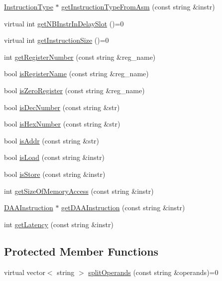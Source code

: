 \begin{DoxyCompactItemize}
\item 
\hyperlink{classInstructionType}{Instruction\+Type} $\ast$ \hyperlink{classArch__dep_ab08ac366e83b7b1f32b982849c9c3ee5}{get\+Instruction\+Type\+From\+Asm} (const string \&instr)
\item 
virtual int \hyperlink{classArch__dep_a7f9d441d7b402294c6faf7b81ee5aa59}{get\+N\+B\+Instr\+In\+Delay\+Slot} ()=0
\item 
virtual int \hyperlink{classArch__dep_a845395b8503a23b2c192e8b4a05ccba9}{get\+Instruction\+Size} ()=0
\item 
int \hyperlink{classArch__dep_adb2c2145f6abeb415436bbe3d622cf70}{get\+Register\+Number} (const string \&reg\+\_\+name)
\item 
bool \hyperlink{classArch__dep_ac12a732622a72990042fc34c96ad0188}{is\+Register\+Name} (const string \&reg\+\_\+name)
\item 
bool \hyperlink{classArch__dep_aaf6d066028c438c8e01194eb13500468}{is\+Zero\+Register} (const string \&reg\+\_\+name)
\item 
bool \hyperlink{classArch__dep_a674e544699e6ba167f7e29e0ea046ffc}{is\+Dec\+Number} (const string \&str)
\item 
bool \hyperlink{classArch__dep_a7c5d045c231fa0aa3890f49c35614a0a}{is\+Hex\+Number} (const string \&str)
\item 
bool \hyperlink{classArch__dep_a4408d5e5fedffe7a6877f226db4ebc69}{is\+Addr} (const string \&str)
\item 
bool \hyperlink{classArch__dep_ac412d77ad36470a99dc562d3e318d78f}{is\+Load} (const string \&instr)
\item 
bool \hyperlink{classArch__dep_afff6d978b8e317027e9b6c97818fc6ab}{is\+Store} (const string \&instr)
\item 
int \hyperlink{classArch__dep_ac0af59ba86c85f71a733f9e56debc411}{get\+Size\+Of\+Memory\+Access} (const string \&instr)
\item 
\hyperlink{classDAAInstruction}{D\+A\+A\+Instruction} $\ast$ \hyperlink{classArch__dep_ab5a1e24af6e96eb1795aec07c1cd3578}{get\+D\+A\+A\+Instruction} (const string \&instr)
\item 
int \hyperlink{classArch__dep_a0b52e67e71b9108513e68020f0f741b7}{get\+Latency} (const string \&instr)
\end{DoxyCompactItemize}
\subsection*{Protected Member Functions}
\begin{DoxyCompactItemize}
\item 
virtual vector$<$ string $>$ \hyperlink{classArch__dep_abf3061756ea53bc4eb3c2447fca9fb5c}{split\+Operands} (const string \&operands)=0
\end{DoxyCompactItemize}
